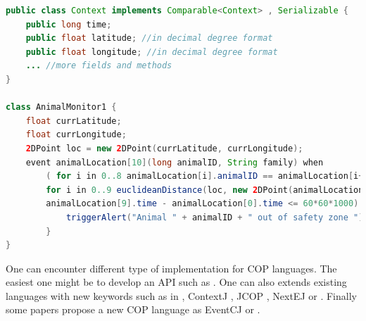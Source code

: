 \documentclass[a4paper]{article}
\begin{document}
\begin{lstlisting}[float, language=Java, caption=EventJava context-dependent behaviour, label={listing:eventjavacontextuse}]
public class Context implements Comparable<Context> , Serializable {
	public long time;
	public float latitude; //in decimal degree format
	public float longitude; //in decimal degree format
	... //more fields and methods
}

class AnimalMonitor1 {
	float currLatitude;
	float currLongitude;
	2DPoint loc = new 2DPoint(currLatitude, currLongitude);
	event animalLocation[10](long animalID, String family) when
		( for i in 0..8 animalLocation[i].animalID == animalLocation[i+1].animalID &&
		for i in 0..9 euclideanDistance(loc, new 2DPoint(animalLocation[i].latitude, animalLocation[i].longitude)) > 0.5 &&
		animalLocation[9].time - animalLocation[0].time <= 60*60*1000) {
			triggerAlert("Animal " + animalID + " out of safety zone ");
		}
}
\end{lstlisting}

One can encounter different type of implementation for COP languages. The easiest one might be to develop an API such as \cite{appeltauer_dedicated_2008}. One can also extends existing languages with new keywords such as in \cite{clarke_semantics_2009}, ContextJ \cite{haupt_contextj:_2011}, JCOP \cite{appeltauer_declarative_2013}, NextEJ \cite{kamina_towards_2009} or \cite{ghezzi_context_2010}. Finally some papers propose a new COP language as  EventCJ \cite{kamina_eventcj:_2011} or \cite{kamina_unified_2013}.
\end{document}
